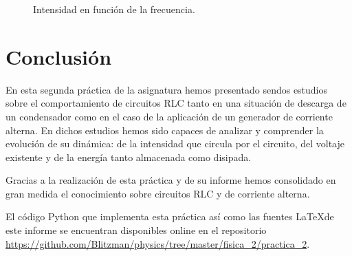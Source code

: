 \documentclass[journal]{IEEEtran}
\begin{document}
\begin{figure}[!htb]
    \caption{Intensidad en función de la frecuencia.}
    \label{fig:intensidadfrecuencia}
\end{figure}

\section{Conclusión}
\label{sec:conclusion}

En esta segunda práctica de la asignatura hemos presentado sendos estudios sobre el comportamiento de circuitos RLC tanto en una situación de descarga de un condensador como en el caso de la aplicación de un generador de corriente alterna. En dichos estudios hemos sido capaces de analizar y comprender la evolución de su dinámica: de la intensidad que circula por el circuito, del voltaje existente y de la energía tanto almacenada como disipada.

Gracias a la realización de esta práctica y de su informe hemos consolidado en gran medida el conocimiento sobre circuitos RLC y de corriente alterna.

El código Python que implementa esta práctica así como las fuentes \LaTeX de este informe se encuentran disponibles online en el repositorio \url{https://github.com/Blitzman/physics/tree/master/fisica_2/practica_2}.
\end{document}
